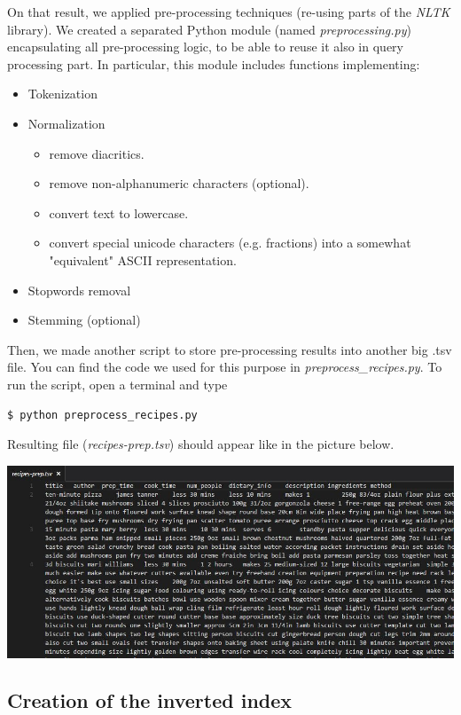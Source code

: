 \noindent On that result, we applied pre-processing techniques (re-using parts of the \textit{NLTK}\cite{nltk} library). We created a separated Python module (named \textit{preprocessing.py}) encapsulating all pre-processing logic, to be able to reuse it also in query processing part. In particular, this module includes functions implementing:
\begin{itemize}
	\item Tokenization
	\item Normalization
	\begin{itemize}
		\item remove diacritics.
		\item remove non-alphanumeric characters (optional).
		\item convert text to lowercase.
		\item convert special unicode characters (e.g. fractions) into a somewhat "equivalent" ASCII representation.
	\end{itemize}
	\item Stopwords removal
	\item Stemming (optional)
\end{itemize}
Then, we made another script to store pre-processing results into another big .tsv file. You can find the code we used for this purpose in \textit{preprocess\_recipes.py}. To run the script, open a terminal and type
\begin{lstlisting}
$ python preprocess_recipes.py
\end{lstlisting}
Resulting file (\textit{recipes-prep.tsv}) should appear like in the picture below.
\begin{center}
	\vspace{5mm}
	\includegraphics[scale=0.5]{img/recipes-prep-tsv.jpg}
\end{center}

\bigskip

\subsection{Creation of the inverted index}

